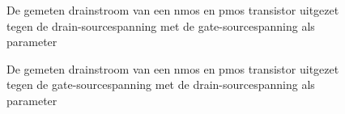 \begin{figure}[hbt]
\caption{\label{npmosidvd} De gemeten drainstroom van een nmos en pmos transistor uitgezet tegen de drain-sourcespanning met de gate-sourcespanning als parameter}
\end{figure}

\begin{figure}[hbt]
\caption{\label{npmosidvg} De gemeten drainstroom van een nmos en pmos transistor uitgezet tegen de gate-sourcespanning met de drain-sourcespanning als parameter}
\end{figure}

\cleardoublepage
